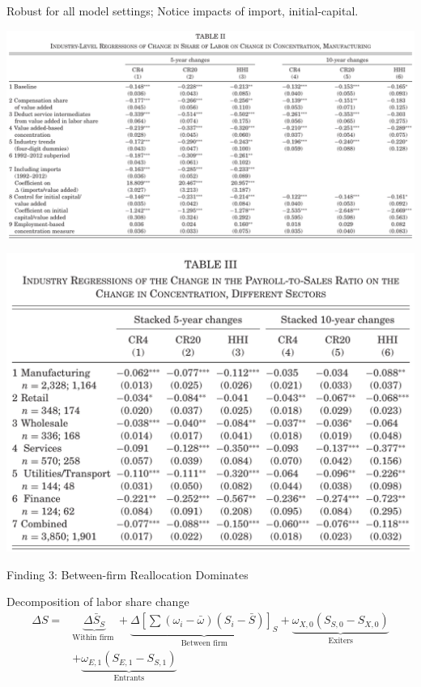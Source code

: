 \documentclass[
  10pt,
  ignorenonframetext,
  aspectratio=43,
]{beamer}
\begin{document}
\begin{frame}
Robust for all model settings; Notice impacts of import,
initial-capital.

\includegraphics{./images/Pasted image 20220516205229.png}\\
\end{frame}

\begin{frame}
\includegraphics{./images/Pasted image 20220516205438.png}\\
\end{frame}

\begin{frame}{Finding 3: Between-firm Reallocation Dominates}
\protect\hypertarget{finding-3-between-firm-reallocation-dominates}{}
\begin{block}{Decomposition of labor share change}
\protect\hypertarget{decomposition-of-labor-share-change}{}
\[
\begin{aligned}
\Delta S=& \underbrace{\Delta \bar{S}_{S}}_{\text{Within firm }} + \underbrace{\Delta\left[\sum\left(\omega_{i}-\bar{\omega}\right)\left(S_{i}-\bar{S}\right)\right]_{S}}_{\text{Between firm}} + \underbrace{\omega_{X, 0}\left(S_{S, 0}-S_{X, 0}\right)}_{\text{Exiters}} \\
&+ \underbrace{\omega_{E, 1}\left(S_{E, 1}-S_{S, 1}\right)}_{\text{Entrants}}
\end{aligned}
\]
\end{block}
\end{frame}
\end{document}
